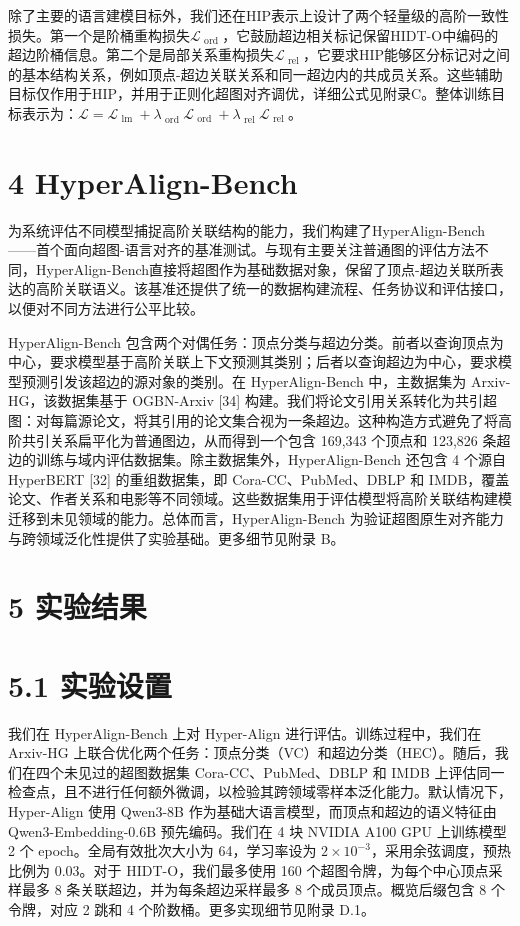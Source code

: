 \documentclass[10pt]{article}
\begin{document}
除了主要的语言建模目标外，我们还在HIP表示上设计了两个轻量级的高阶一致性损失。第一个是阶桶重构损失\({\mathcal{L}}_{\text{ ord }}\)，它鼓励超边相关标记保留HIDT-O中编码的超边阶桶信息。第二个是局部关系重构损失\({\mathcal{L}}_{\text{ rel }}\)，它要求HIP能够区分标记对之间的基本结构关系，例如顶点-超边关联关系和同一超边内的共成员关系。这些辅助目标仅作用于HIP，并用于正则化超图对齐调优，详细公式见附录C。整体训练目标表示为：\(\mathcal{L} = {\mathcal{L}}_{\text{ lm }} + {\lambda }_{\text{ ord }}{\mathcal{L}}_{\text{ ord }} + {\lambda }_{\text{ rel }}{\mathcal{L}}_{\text{ rel }}\)。

\section*{4 HyperAlign-Bench}

为系统评估不同模型捕捉高阶关联结构的能力，我们构建了HyperAlign-Bench——首个面向超图-语言对齐的基准测试。与现有主要关注普通图的评估方法不同，HyperAlign-Bench直接将超图作为基础数据对象，保留了顶点-超边关联所表达的高阶关联语义。该基准还提供了统一的数据构建流程、任务协议和评估接口，以便对不同方法进行公平比较。

HyperAlign-Bench 包含两个对偶任务：顶点分类与超边分类。前者以查询顶点为中心，要求模型基于高阶关联上下文预测其类别；后者以查询超边为中心，要求模型预测引发该超边的源对象的类别。在 HyperAlign-Bench 中，主数据集为 Arxiv-HG，该数据集基于 OGBN-Arxiv [34] 构建。我们将论文引用关系转化为共引超图：对每篇源论文，将其引用的论文集合视为一条超边。这种构造方式避免了将高阶共引关系扁平化为普通图边，从而得到一个包含 169,343 个顶点和 123,826 条超边的训练与域内评估数据集。除主数据集外，HyperAlign-Bench 还包含 4 个源自 HyperBERT [32] 的重组数据集，即 Cora-CC、PubMed、DBLP 和 IMDB，覆盖论文、作者关系和电影等不同领域。这些数据集用于评估模型将高阶关联结构建模迁移到未见领域的能力。总体而言，HyperAlign-Bench 为验证超图原生对齐能力与跨领域泛化性提供了实验基础。更多细节见附录 B。

\section*{5 实验结果}

\section*{5.1 实验设置}

我们在 HyperAlign-Bench 上对 Hyper-Align 进行评估。训练过程中，我们在 Arxiv-HG 上联合优化两个任务：顶点分类（VC）和超边分类（HEC）。随后，我们在四个未见过的超图数据集 Cora-CC、PubMed、DBLP 和 IMDB 上评估同一检查点，且不进行任何额外微调，以检验其跨领域零样本泛化能力。默认情况下，Hyper-Align 使用 Qwen3-8B 作为基础大语言模型，而顶点和超边的语义特征由 Qwen3-Embedding-0.6B 预先编码。我们在 4 块 NVIDIA A100 GPU 上训练模型 2 个 epoch。全局有效批次大小为 64，学习率设为 \(2 \times{10}^{-3}\)，采用余弦调度，预热比例为 0.03。对于 HIDT-O，我们最多使用 160 个超图令牌，为每个中心顶点采样最多 8 条关联超边，并为每条超边采样最多 8 个成员顶点。概览后缀包含 8 个令牌，对应 2 跳和 4 个阶数桶。更多实现细节见附录 D.1。
\end{document}
